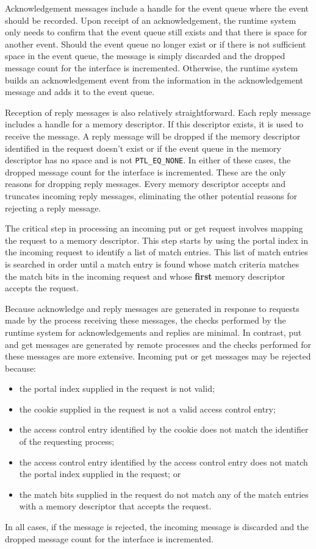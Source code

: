 \documentclass{sand-report}
\begin{document}
Acknowledgement messages include a handle for the event queue where
the event should be recorded.  Upon receipt of an acknowledgement, the
runtime system only needs to confirm that the event queue still exists
and that there is space for another event.  Should the event queue no
longer exist or if there is not sufficient space in the event queue,
the message is simply discarded and the dropped message count for the
interface is incremented.  Otherwise, the runtime system builds an
acknowledgement event from the information in the acknowledgement
message and adds it to the event queue.

Reception of reply messages is also relatively straightforward.  Each
reply message includes a handle for a memory descriptor.  If this
descriptor exists, it is used to receive the message.  A reply message
will be dropped if the memory descriptor identified in the request
doesn't exist or if the event queue in the memory descriptor has no
space and is not \texttt{PTL_EQ_NONE}.  In either of these cases, the
dropped message count for the interface is incremented.  These are the
only reasons for dropping reply messages.  Every memory descriptor
accepts and truncates incoming reply messages, eliminating the other
potential reasons for rejecting a reply message.

The critical step in processing an incoming put or get request
involves mapping the request to a memory descriptor.  This step starts
by using the portal index in the incoming request to identify a list
of match entries.  This list of match entries is searched in order
until a match entry is found whose match criteria matches the match
bits in the incoming request and whose \textbf{first} memory
descriptor accepts the request.

Because acknowledge and reply messages are generated in response to
requests made by the process receiving these messages, the checks
performed by the runtime system for acknowledgements and replies are
minimal.  In contrast, put and get messages are generated by remote
processes and the checks performed for these messages are more
extensive.  Incoming put or get messages may be rejected because:
\begin{itemize}
\item the portal index supplied in the request is not valid; 
\item the cookie supplied in the request is not a valid access control
  entry;
\item the access control entry identified by the cookie does not match
  the identifier of the requesting process;
\item the access control entry identified by the access control entry
  does not match the portal index supplied in the request; or
\item the match bits supplied in the request do not match any of the
  match entries with a memory descriptor that accepts the request.
\end{itemize}
In all cases, if the message is rejected, the incoming message is
discarded and the dropped message count for the interface is
incremented.
\end{document}
